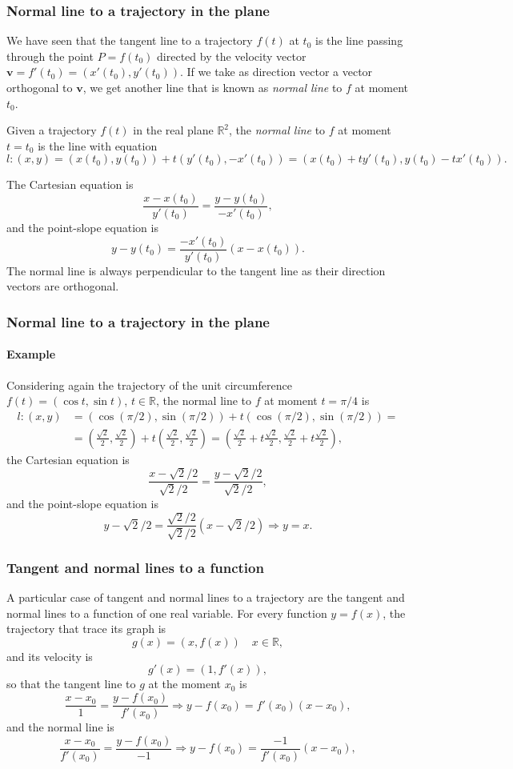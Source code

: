 \begin{frame}
\frametitle{Normal line to a trajectory in the plane}
We have seen that the tangent line to a trajectory $f(t)$ at $t_0$ is the line passing through the point 
$P=f(t_0)$ directed by the velocity vector $\mathbf{v}=f'(t_0)=(x'(t_0),y'(t_0))$. 
If we take as direction vector a vector orthogonal to $\mathbf{v}$, we get another line that is known as \emph{normal line} to $f$ at moment $t_0$.
\begin{definition}
Given a trajectory $f(t)$ in the real plane $\mathbb{R}^2$, the \emph{normal line} to $f$ at moment $t=t_0$ is the line with equation
\[
l: (x,y)=(x(t_0),y(t_0))+t(y'(t_0),-x'(t_0)) = (x(t_0)+ty'(t_0),y(t_0)-tx'(t_0)).
\]
\end{definition}
The Cartesian equation is 
\[
\frac{x-x(t_0)}{y'(t_0)} = \frac{y-y(t_0)}{-x'(t_0)},
\]
and the point-slope equation is
\[
y-y(t_0) = \frac{-x'(t_0)}{y'(t_0)}(x-x(t_0)).
\]
The normal line is always perpendicular to the tangent line as their direction vectors are orthogonal. 
\end{frame}


\begin{frame}
\frametitle{Normal line to a trajectory in the plane}
\framesubtitle{Example}
Considering again the trajectory of the unit circumference $f(t) = (\cos t,\sin t)$, $t\in \mathbb{R}$, the normal line to $f$ at moment $t=\pi/4$ is
\begin{align*}
l: (x,y)&=(\cos(\pi/2),\sin(\pi/2))+t(\cos(\pi/2),\sin(\pi/2)) =\\
&= \left(\frac{\sqrt{2}}{2},\frac{\sqrt{2}}{2}\right)+t\left(\frac{\sqrt{2}}{2},\frac{\sqrt{2}}{2}\right)
=\left(\frac{\sqrt{2}}{2}+t\frac{\sqrt{2}}{2},\frac{\sqrt{2}}{2}+t\frac{\sqrt{2}}{2}\right),
\end{align*}
the Cartesian equation is 
\[
\frac{x-\sqrt{2}/2}{\sqrt{2}/2} = \frac{y-\sqrt{2}/2}{\sqrt{2}/2},
\]
and the point-slope equation is 
\[
y-\sqrt{2}/2 = \frac{\sqrt{2}/2}{\sqrt{2}/2}(x-\sqrt{2}/2) \Rightarrow y=x.
\]
\end{frame}


\begin{frame}
\frametitle{Tangent and normal lines to a function}
A particular case of tangent and normal lines to a trajectory are the tangent and normal lines to a function of one real variable. 
For every function $y=f(x)$, the trajectory that trace its graph is
\[
g(x) = (x,f(x))  \quad x\in \mathbb{R},
\]
and its velocity is 
\[
g'(x) = (1,f'(x)),
\]
so that the tangent line to $g$ at the moment $x_0$ is
\[
\frac{x-x_0}{1} = \frac{y-f(x_0)}{f'(x_0)} \Rightarrow y-f(x_0) = f'(x_0)(x-x_0),
\]
and the normal line is 
\[
\frac{x-x_0}{f'(x_0)} = \frac{y-f(x_0)}{-1} \Rightarrow y-f(x_0) = \frac{-1}{f'(x_0)}(x-x_0),
\]
\end{frame}


